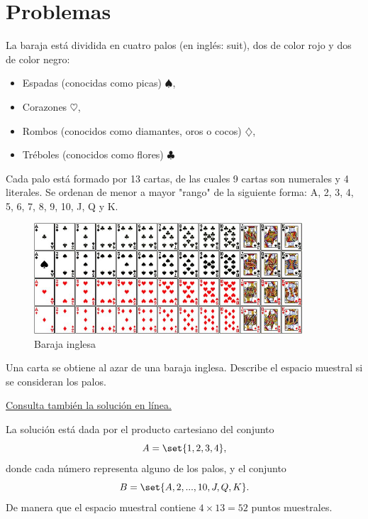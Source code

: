 
\section*{Problemas}

La baraja está dividida en cuatro palos (en inglés: suit), dos de color rojo y dos de color negro:
\begin{itemize}
	\item Espadas (conocidas como picas) $\spadesuit$,
	\item Corazones $\heartsuit$,
	\item Rombos (conocidos como diamantes, oros o cocos) $ \diamondsuit$,
	\item Tréboles (conocidos como flores) $\clubsuit$
\end{itemize}

Cada palo está formado por 13 cartas, de las cuales 9 cartas son numerales y 4 literales. Se ordenan de menor a mayor "rango" de la siguiente forma: A, 2, 3, 4, 5, 6, 7, 8, 9, 10, J, Q y K.

\begin{figure}
	\centering
	\includegraphics[width=10cm]{./pe/deck.jpg}
	\caption{Baraja inglesa}
	\label{fig:deck}
\end{figure}



\begin{problema}
	\label{problema:2.1}
	Una carta se obtiene al azar de una baraja inglesa. Describe el espacio muestral si se consideran los palos.
\end{problema}

\begin{solucion}\label{solucion:2.1}
	
	\href{https://youtu.be/4LdLWpQIcBQ}{Consulta también la solución en línea.}
	
	
	La solución está dada por el producto cartesiano del conjunto \begin{equation} A = \set{1,2,3,4}, \end{equation} donde cada número representa alguno de los palos, y el conjunto \begin{equation} B = \set{A,2,...,10,J,Q,K}.\end{equation} De manera que el espacio muestral contiene $ 4\times 13=52 $ puntos muestrales. 	
\end{solucion}


